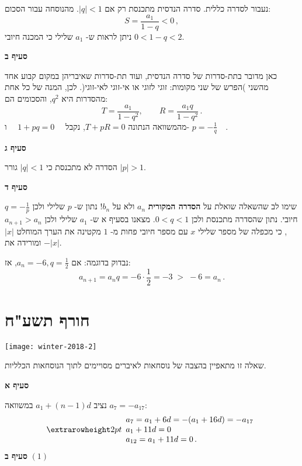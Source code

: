 \np

נעבור לסדרה כללית. סדרה הנדסית מתכנסת רק אם
$|q|<1$.
מהנוסחה עבור הסכום:
\[
S = \frac{a_1}{1-q} <0\,,
\]
ניתן לראות ש-%
$a_1$
שלילי כי המכנה חיובי
$0 < 1-q < 2$.

\smallskip

\textbf{סעיף ב}

כאן מדובר בתת-סדרות של סדרה הנדסית, ועוד תת-סדרות שאיבריהן במקום קבוע אחד מהשני )הפרש של שני מקומות: זוגי לזוגי או אי-זוגי לאי-זוגי(. לכן, המנה של כל אחת מהסדרות היא
$q^2$,
והסכומים הם:
\[
T = \frac{a_1}{1-q^2},\quad\quad R = \frac{a_1q}{1-q^2}\,.
\]
מהמשוואה הנתונה
$T+pR=0$,
נקבל
$\quad 1+pq=0\quad$
ו-%
$p=-\displaystyle\frac{1}{q}\quad$.

\smallskip

\textbf{סעיף ג}

הסדרה לא מתכנסת כי 
$|q|<1$
גורר
$|p|>1$.

\smallskip

\textbf{סעיף ד}

שימו לב שהשאלה שואלת על
\textbf{הסדרה המקורית}
$a_n$
ולא על 
$b_n$!
נתון ש-%
$p$
שלילי ולכן
$q=-\displaystyle\frac{1}{p}$
חיובי. נתון שהסדרה מתכנסת ולכן
$0<q<1$.
מצאנו בסעיף א ש-%
$a_1$
שלילי ולכן
$a_{n+1}>a_n$,
כי מכפלה של מספר שלילי
$x$
עם מספר חיובי פחות מ-%
$1$
מקטינה את הערך המוחלט
$|x|$
ומורידה את
$-|x|$.

נבדוק בדוגמה: אם 
$a_n=-6,q=\frac{1}{2}$,
אז:
\[
a_{n+1} = a_nq = -6\cdot \frac{1}{2} = -3 \;> \; -6 =a_n\,.
\]



\np
\section{חורף תשע"ח}

\begin{center}
\texttt{[image: winter-2018-2]}
\end{center}

\vspace{-1ex}

שאלה זו מתאפיין בהצבה של נוסחאות לאיברים מסויימים לתוך הנוסחאות הכלליות.

\smallskip

\textbf{סעיף א}

נציב 
$a_1+(n-1)d$
במשוואה
$a_7=-a_{17}$:
\[
\erh{2pt}
\begin{array}{l}
a_7=a_1+6d = -(a_1+16d)=-a_{17}\\
a_1+11d=0\\
a_{12}=a_1+11d=0\,.
\end{array}
\]
\textbf{סעיף ב}
$(1)$

